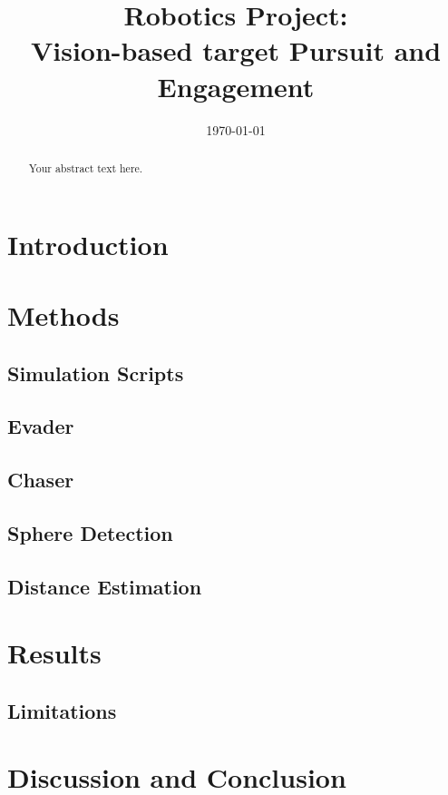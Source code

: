 \documentclass[conference]{IEEEtran}
\title{Robotics Project:\\ Vision-based target Pursuit and Engagement}
\date{\today}
\author{  
  \IEEEauthorblockN{Alessio Tommasi}
  \IEEEauthorblockA{
    alessio.tommasi@usi.ch
  }
  \and
  \IEEEauthorblockN{Jonas Knupp}
  \IEEEauthorblockA{
    jonas.knupp@usi.ch
  }
}
\begin{document}
\maketitle
\newpage

\begin{abstract}
Your abstract text here.
\end{abstract}

\section{Introduction}

\section{Methods}

\subsection{Simulation Scripts}

\subsection{Evader}


\subsection{Chaser}

\subsection{Sphere Detection}

\subsection{Distance Estimation}

\section{Results}

\subsection{Limitations}

\section{Discussion and Conclusion}
\end{document}
